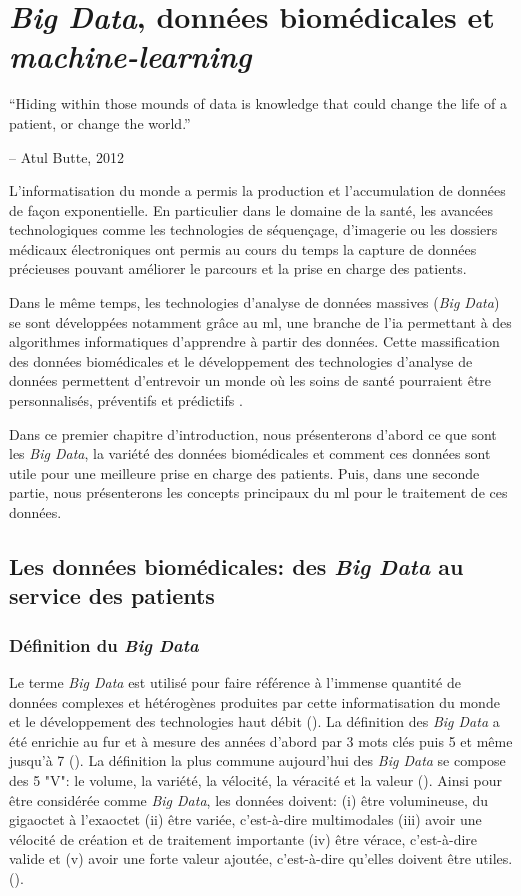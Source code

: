 \chapter{ \textit{Big Data}, données biomédicales et \textit{machine-learning}}

\epigraph{\LARGE{``Hiding within those mounds of data is knowledge that could change the life of a patient, or change the world.''}}{\LARGE{-- Atul Butte, 2012}}

L'informatisation du monde a permis la production et l'accumulation de données de façon exponentielle. En particulier dans le domaine de la santé, les avancées technologiques comme les technologies de séquençage, d'imagerie ou les dossiers médicaux électroniques ont permis au cours du temps la capture de données précieuses pouvant améliorer le parcours et la prise en charge des patients.

Dans le même temps, les technologies d'analyse de données massives (\textit{Big Data}) se sont développées notamment grâce au \gls{ml}, une branche de l'\gls{ia} permettant à des algorithmes informatiques d'apprendre à partir des données. Cette massification des données biomédicales et le développement des technologies d'analyse de données permettent d'entrevoir un monde où les soins de santé pourraient être personnalisés, préventifs et prédictifs .

Dans ce premier chapitre d'introduction, nous présenterons d'abord ce que sont les \textit{Big Data}, la variété des données biomédicales et comment ces données sont utile pour une meilleure prise en charge des patients. Puis, dans une seconde partie, nous présenterons les concepts principaux du \gls{ml} pour le traitement de ces données.

\section{Les données biomédicales: des \textit{Big Data} au service des patients}

\subsection{Définition du \textit{Big Data}}

Le terme \textit{Big Data} est utilisé pour faire référence à l'immense quantité de données complexes et hétérogènes produites par cette informatisation du monde et le développement des technologies haut débit (\cite{de_mauro_formal_2016}). La définition des \textit{Big Data} a été enrichie au fur et à mesure des années d'abord par 3 mots clés puis 5 et même jusqu'à 7 (\cite{garcia_what_2022}). La définition la plus commune aujourd'hui des \textit{Big Data} se compose des 5 "V": le volume, la variété, la vélocité, la véracité et la valeur (\cite{ishwarappa_brief_2015}). Ainsi pour être considérée comme \textit{Big Data}, les données doivent: (i) être volumineuse, du gigaoctet à l'exaoctet (ii) être variée, c'est-à-dire multimodales (iii) avoir une vélocité de création et de traitement importante (iv) être vérace, c'est-à-dire valide et (v) avoir une forte valeur ajoutée, c'est-à-dire qu'elles doivent être utiles. (\cite{garcia_what_2022}).

